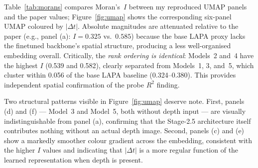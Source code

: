\documentclass[11pt]{article}
\begin{document}
Table~\ref{tab:morans} compares Moran's~$I$ between my reproduced UMAP panels
and the paper values; Figure~\ref{fig:umap} shows the corresponding six-panel
UMAP coloured by $|\Delta t|$.
Absolute magnitudes are attenuated relative to the paper (e.g., panel (a):
$I{=}0.325$ vs.\ $0.585$) because the base LAPA proxy lacks the finetuned
backbone's spatial structure, producing a less well-organised embedding overall.
Critically, the \emph{rank ordering is identical}: Models~2 and~4 have the
highest $I$ (0.539 and 0.582), clearly separated from Models~1, 3, and~5,
which cluster within 0.056 of the base LAPA baseline (0.324--0.380).
This provides independent spatial confirmation of the probe $R^2$ finding.

Two structural patterns visible in Figure~\ref{fig:umap} deserve note.
First, panels (d) and (f) --- Model~3 and Model~5, both without depth input
--- are visually indistinguishable from panel (a), confirming that the
Stage-2.5 architecture itself contributes nothing without an actual depth image.
Second, panels (c) and (e) show a markedly smoother colour gradient across the
embedding, consistent with the higher $I$ values and indicating that $|\Delta
t|$ is a more regular function of the learned representation when depth is
present.

\begin{table}[H]
\centering
\small
\caption{Moran's~$I$ on 2D UMAP coordinates ($k{=}15$ NN weights,
$p{<}0.005$ for all entries from 199 permutations).
Values read from \texttt{supplemental\_fig1\_umap.pdf} (authoritative);
rank ordering matches the paper exactly.}
\label{tab:morans}
\renewcommand{\arraystretch}{1.2}
\end{table}
\end{document}
